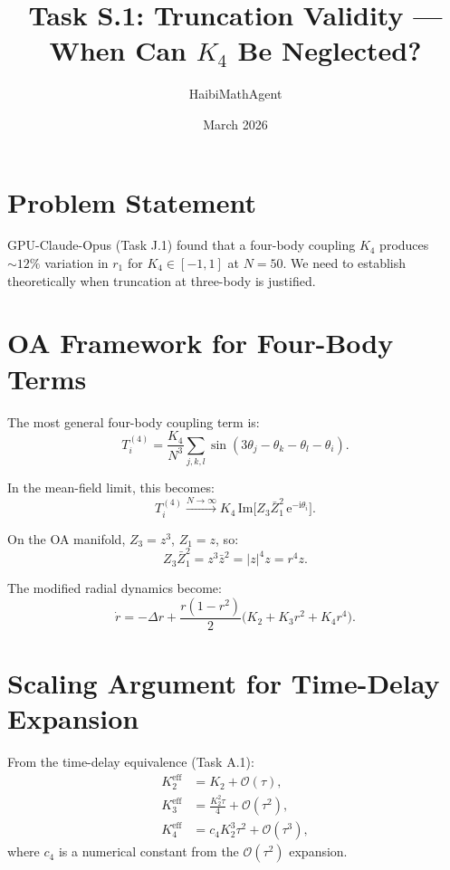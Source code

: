 \documentclass[11pt]{article}
\title{Task S.1: Truncation Validity --- When Can $K_4$ Be Neglected?}
\author{HaibiMathAgent}
\date{March 2026}
\newcommand{\ii}{\mathrm{i}}
\newcommand{\ee}{\mathrm{e}}
\newcommand{\Order}{\mathcal{O}}
\begin{document}
\maketitle

\section{Problem Statement}

GPU-Claude-Opus (Task J.1) found that a four-body coupling $K_4$ produces
$\sim12\%$ variation in $r_1$ for $K_4\in[-1,1]$ at $N=50$.  We need to
establish theoretically when truncation at three-body is justified.

\section{OA Framework for Four-Body Terms}

The most general four-body coupling term is:
\begin{equation}
  T_i^{(4)} = \frac{K_4}{N^3}\sum_{j,k,l}\sin(3\theta_j - \theta_k - \theta_l - \theta_i).
\end{equation}

In the mean-field limit, this becomes:
\begin{equation}
  T_i^{(4)} \xrightarrow{N\to\infty} K_4\,\mathrm{Im}\bigl[Z_3\bar{Z}_1^2\,\ee^{-\ii\theta_i}\bigr].
\end{equation}

On the OA manifold, $Z_3 = z^3$, $Z_1 = z$, so:
\begin{equation}
  Z_3\bar{Z}_1^2 = z^3\bar{z}^2 = |z|^4 z = r^4 z.
\end{equation}

The modified radial dynamics become:
\begin{equation}
  \dot{r} = -\Delta r + \frac{r(1-r^2)}{2}\bigl(K_2 + K_3 r^2 + K_4 r^4\bigr).
  \label{eq:r-K4}
\end{equation}

\section{Scaling Argument for Time-Delay Expansion}

From the time-delay equivalence (Task A.1):
\begin{align}
  K_2^{\mathrm{eff}} &= K_2 + \Order(\tau), \\
  K_3^{\mathrm{eff}} &= \frac{K_2^2\tau}{4} + \Order(\tau^2), \\
  K_4^{\mathrm{eff}} &= c_4 K_2^3\tau^2 + \Order(\tau^3),
\end{align}
where $c_4$ is a numerical constant from the $\Order(\tau^2)$ expansion.
\end{document}
